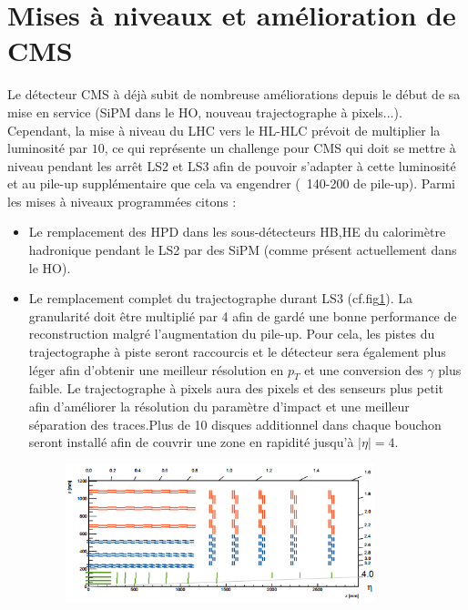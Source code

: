 \section{Mises à niveaux et amélioration de CMS}
Le détecteur CMS à déjà subit de nombreuse améliorations depuis le début de sa mise en service (SiPM dans le HO, nouveau trajectographe à pixels...). Cependant, la mise à niveau du LHC vers le HL-HLC prévoit de multiplier la luminosité par $10$, ce qui représente un challenge pour CMS qui doit se mettre à niveau pendant les arrêt LS2 et LS3 afin de pouvoir s'adapter à cette luminosité et au pile-up supplémentaire que cela va engendrer (~140-200 de pile-up). Parmi les mises à niveaux programmées citons \cite{Collaboration:1355706} \cite{Contardo:2020886} :
\begin{itemize}[label=$\bullet$]
	\item Le remplacement des HPD dans les sous-détecteurs HB,HE du calorimètre hadronique pendant le LS2 par des SiPM (comme présent actuellement dans le HO).
	\item Le remplacement complet du trajectographe durant LS3 (cf.fig\ref{tracker2}). La granularité doit être multiplié par 4 afin de gardé une bonne performance de reconstruction malgré l'augmentation du pile-up. Pour cela, les pistes du trajectographe à piste seront raccourcis et le détecteur sera également plus léger afin d'obtenir une meilleur résolution en $p_{T}$ et une conversion des $\gamma$ plus faible. Le trajectographe à pixels aura des pixels et des senseurs plus petit afin d'améliorer la résolution du paramètre d'impact et une meilleur séparation des traces.Plus de 10 disques additionnel dans chaque bouchon seront installé afin de couvrir une zone en rapidité jusqu'à $|\eta|=4$.
	\begin{figure}[ht!]
		\centering
		\includegraphics[width=0.85\textwidth]{CMS/tracker2.png}
		\label{tracker2}
	\end{figure}

\end{itemize}
